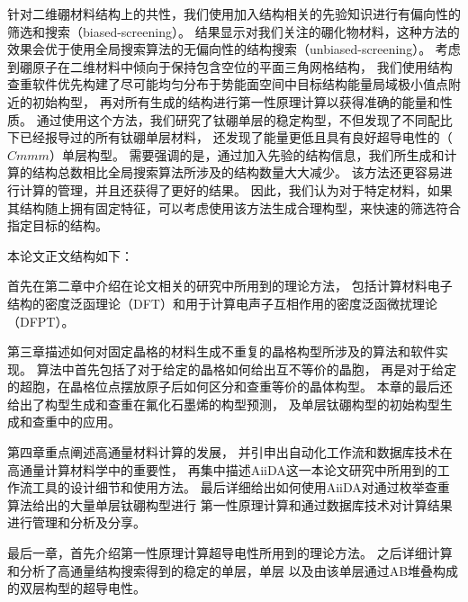 针对二维硼材料结构上的共性，我们使用加入结构相关的先验知识进行有偏向性的筛选和搜索（biased-screening）。
结果显示对我们关注的硼化物材料，这种方法的效果会优于使用全局搜索算法的无偏向性的结构搜索（unbiased-screening）。
考虑到硼原子在二维材料中倾向于保持包含空位的平面三角网格结构，
我们使用结构查重软件优先构建了尽可能均匀分布于势能面空间中目标结构能量局域极小值点附近的初始构型，
再对所有生成的结构进行第一性原理计算以获得准确的能量和性质。
通过使用这个方法，我们研究了钛硼单层的稳定构型，不但发现了不同配比下已经报导过的所有钛硼单层材料，
还发现了能量更低且具有良好超导电性的（$Cmmm$）单层构型。
需要强调的是，通过加入先验的结构信息，我们所生成和计算的结构总数相比全局搜索算法所涉及的结构数量大大减少。
该方法还更容易进行计算的管理，并且还获得了更好的结果。
因此，我们认为对于特定材料，如果其结构随上拥有固定特征，可以考虑使用该方法生成合理构型，来快速的筛选符合指定目标的结构。

本论文正文结构如下：
\begin{romanenum}
  \item 首先在第二章中介绍在论文相关的研究中所用到的理论方法，
  包括计算材料电子结构的密度泛函理论（DFT）和用于计算电声子互相作用的密度泛函微扰理论（DFPT）。
  \item 第三章描述如何对固定晶格的材料生成不重复的晶格构型所涉及的算法和软件实现。
  算法中首先包括了对于给定的晶格如何给出互不等价的晶胞，
  再是对于给定的超胞，在晶格位点摆放原子后如何区分和查重等价的晶体构型。
  本章的最后还给出了构型生成和查重在氟化石墨烯的构型预测，
  及单层钛硼构型的初始构型生成和查重中的应用。
  \item 第四章重点阐述高通量材料计算的发展，
  并引申出自动化工作流和数据库技术在高通量计算材料学中的重要性，
  再集中描述AiiDA这一本论文研究中所用到的工作流工具的设计细节和使用方法。
  最后详细给出如何使用AiiDA对通过枚举查重算法给出的大量单层钛硼构型进行
  第一性原理计算和通过数据库技术对计算结果进行管理和分析及分享。
  \item 最后一章，首先介绍第一性原理计算超导电性所用到的理论方法。
  之后详细计算和分析了高通量结构搜索得到的稳定的单层，单层
  以及由该单层通过AB堆叠构成的双层构型的超导电性。
\end{romanenum}
